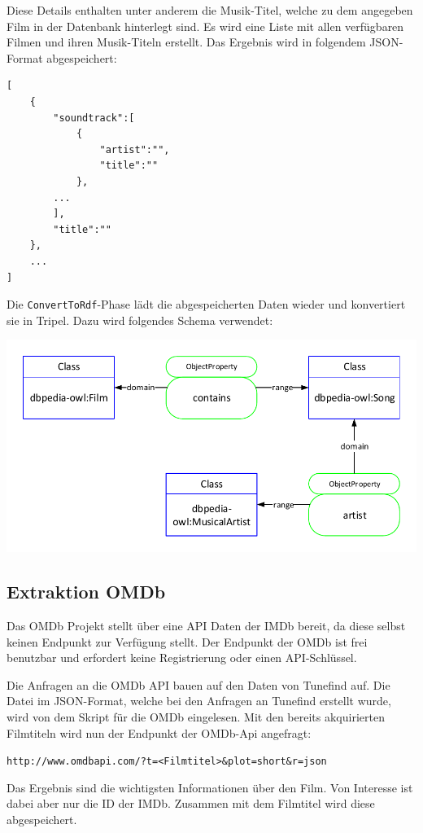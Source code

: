 \documentclass[parskip]{scrartcl}
\begin{document}
Diese Details enthalten unter anderem die Musik-Titel, welche zu dem angegeben Film in der Datenbank hinterlegt sind.
Es wird eine Liste mit allen verfügbaren Filmen und ihren Musik-Titeln erstellt. Das Ergebnis wird in folgendem JSON-Format abgespeichert:

\begin{lstlisting}[caption={Tunefind JSON-Format}, label={list:tunefindJson}]
[  
    {  
        "soundtrack":[  
            {
                "artist":"",
                "title":""
            },
        ...
        ],
        "title":""
    },
    ...
]
\end{lstlisting}

Die \texttt{ConvertToRdf}-Phase lädt die abgespeicherten Daten wieder und konvertiert sie in Tripel. Dazu wird folgendes Schema verwendet:

\includegraphics[scale=0.7]{tunefind}

\subsection{Extraktion OMDb}

Das OMDb Projekt stellt über eine API Daten der IMDb bereit, da diese selbst keinen Endpunkt zur Verfügung stellt. Der Endpunkt der OMDb ist frei benutzbar und erfordert keine Registrierung oder einen API-Schlüssel.

Die Anfragen an die OMDb API bauen auf den Daten von Tunefind auf. Die Datei im JSON-Format, welche bei den Anfragen an Tunefind erstellt wurde, wird von dem Skript für die OMDb eingelesen. Mit den bereits akquirierten Filmtiteln wird nun der Endpunkt der OMDb-Api angefragt:

\texttt{http://www.omdbapi.com/?t=<Filmtitel>\&plot=short\&r=json}

Das Ergebnis sind die wichtigsten Informationen über den Film. Von Interesse ist dabei aber nur die ID der IMDb. Zusammen mit dem Filmtitel wird diese abgespeichert.
\end{document}
